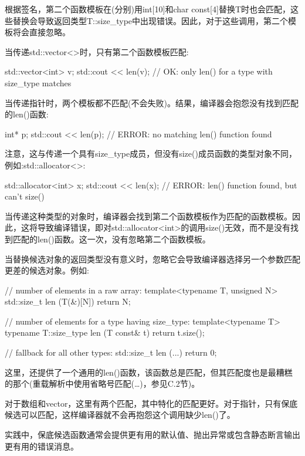 根据签名，第二个函数模板在(分别)用int[10]和char const[4]替换T时也会匹配，这些替换会导致返回类型T::size\_type中出现错误。因此，对于这些调用，第二个模板将会直接忽略。

当传递std::vector<>时，只有第二个函数模板匹配:

\begin{cpp}
std::vector<int> v;
std::cout << len(v); // OK: only len() for a type with size_type matches
\end{cpp}

当传递指针时，两个模板都不匹配(不会失败)。结果，编译器会抱怨没有找到匹配的len()函数:

\begin{cpp}
int* p;
std::cout << len(p); // ERROR: no matching len() function found
\end{cpp}

注意，这与传递一个具有size\_type成员，但没有size()成员函数的类型对象不同，例如:std::allocator<>:

\begin{cpp}
std::allocator<int> x;
std::cout << len(x); // ERROR: len() function found, but can't size()
\end{cpp}

当传递这种类型的对象时，编译器会找到第二个函数模板作为匹配的函数模板。因此，这将导致编译错误，即对std::allocator<int>的调用size()无效，而不是没有找到匹配的len()函数。这一次，没有忽略第二个函数模板。

当替换候选对象的返回类型没有意义时，忽略它会导致编译器选择另一个参数匹配更差的候选对象。例如:

\begin{cpp}
// number of elements in a raw array:
template<typename T, unsigned N>
std::size_t len (T(&)[N])
{
	return N;
}

// number of elements for a type having size_type:
template<typename T>
typename T::size_type len (T const& t)
{
	return t.size();
}

// fallback for all other types:
std::size_t len (...)
{
	return 0;
}
\end{cpp}

这里，还提供了一个通用的len()函数，该函数总是匹配，但其匹配度也是最糟糕的那个(重载解析中使用省略号匹配(…)，参见C.2节)。

对于数组和vector，这里有两个匹配，其中特化的匹配更好。对于指针，只有保底候选可以匹配，这样编译器就不会再抱怨这个调用缺少len()了。

\begin{notice}
实践中，保底候选函数通常会提供更有用的默认值、抛出异常或包含静态断言输出更有用的错误消息。
\end{notice}

